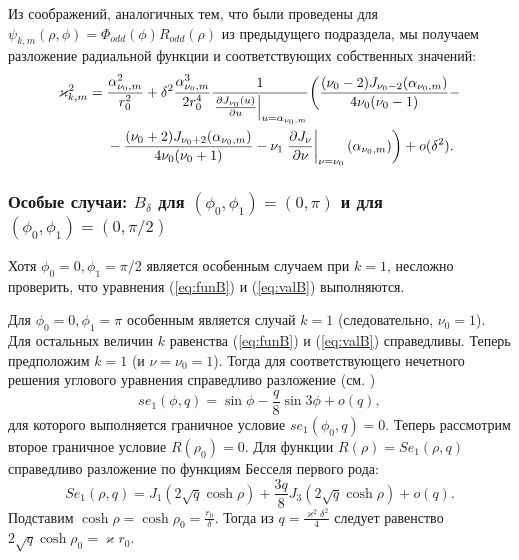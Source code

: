 Из соображений, аналогичных тем, что были проведены для  $\psi_{k, m}(\rho, \phi) = \Phi_{odd}(\phi) R_{odd}(\rho)$ из предыдущего подраздела,
мы получаем разложение радиальной функции и соответствующих собственных значений:
\begin{align*}
    \varkappa_{k, m}^2 ={}& \frac{\alpha_{\nu_0, m}^2}{r_0^2} +  \delta^2 \frac{\alpha_{\nu_0, m}^3}{2 r_0^4}\frac{1}{ \left.\frac{\partial J_{\nu_0}(u)}{\partial u}\right|_{u=\alpha_{\nu_0, m}} }\biggl(\frac{(\nu_0 - 2)J_{\nu_0-2}(\alpha_{\nu_0, m})   }{4\nu_0 (\nu_0-1)} - \notag \\
&{}- \frac{(\nu_0 + 2)J_{\nu_0+2}(\alpha_{\nu_0, m})}{4\nu_0 (\nu_0+1)}  - \nu_1 \left.\frac{\partial J_\nu}{\partial \nu}\right|_{\nu = \nu_0}(\alpha_{\nu_0, m})
    \biggr) + o(\delta^2).
\end{align*}

\subsubsection{Особые случаи: $B_\delta$ для $(\phi_0, \phi_1)=(0,\pi)$ и для $(\phi_0, \phi_1)=(0,\pi/2)$}\label{sec:ch2/sec2/sub2/sub2}


Хотя $\phi_0=0, \phi_1=\pi/2$ является особенным случаем при $k=1$,
несложно проверить, что уравнения (\ref{eq:funB}) и (\ref{eq:valB}) выполняются.

Для  $\phi_0=0, \phi_1=\pi$
особенным является случай  $k=1$ (следовательно, $\nu_0=1$). 
Для остальных величин $k$ равенства (\ref{eq:funB}) и (\ref{eq:valB}) справедливы.
Теперь предположим $k=1$ (и $\nu=\nu_0 = 1$).
Тогда для соответствующего нечетного решения углового уравнения справедливо разложение  (см. \cite[Subsect.~20.2.27]{wref2})
\begin{equation*}
se_1(\phi, q) = 	\sin{\phi}  - 	\frac{q}{8} \sin{3\phi} + o(q),
 \end{equation*}
для которого выполняется граничное условие $se_1(\phi_0, q)=0$. 
Теперь рассмотрим второе граничное условие $R(\rho_0) = 0$. 
Для функции $R(\rho) = Se_1(\rho, q)$ справедливо разложение по функциям Бесселя первого рода:
\begin{equation*}
Se_1(\rho, q) = J_1(2\sqrt{q} \cosh{\rho}) + \frac{3 q}{8} J_3(2\sqrt{q}\cosh{\rho}) + o(q).
\end{equation*}
Подставим $\cosh \rho = \cosh \rho_0 =\frac{r_0}{\delta}$.
Тогда из $q = \frac{\varkappa^2 \delta^2}{4}$ следует равенство
$2\sqrt{q} \cosh{\rho_0} =  \varkappa r_0$.

